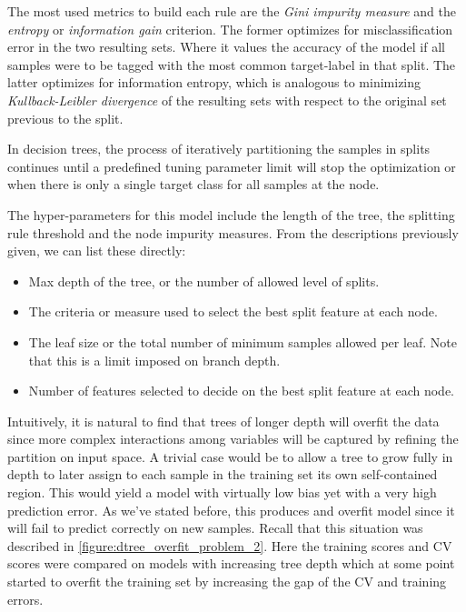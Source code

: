 The most used metrics to build each rule are the \textit{Gini impurity measure} and the \textit{entropy} or \textit{information gain} criterion. The former optimizes for misclassification error in the two resulting sets. Where it values the accuracy of the model if all samples were to be tagged with the most common target-label in that split. The latter optimizes for information entropy, which is analogous to minimizing \textit{Kullback-Leibler divergence} of the resulting sets with respect to the original set previous to the split.

In decision trees, the process of iteratively partitioning the samples in splits continues until a predefined tuning parameter limit will stop the optimization or when there is only a single target class for all samples at the node.

The hyper-parameters for this model include the length of the tree, the splitting rule threshold and the node impurity measures. From the descriptions previously given, we can list these directly:

\begin{itemize}
\item Max depth of the tree, or the number of allowed level of splits.
\item The criteria or measure used to select the best split feature at each node.
\item The leaf size or the total number of minimum samples allowed per leaf. Note that this is a limit imposed on branch depth.
\item Number of features selected to decide on the best split feature at each node.
\end{itemize}



Intuitively, it is natural to find that trees of longer depth will overfit the data since more complex interactions among variables will be captured by refining the partition on input space. A trivial case would be to allow a tree to grow fully in depth to later assign to each sample in the training set its own self-contained region. This would yield a model with virtually low bias yet with a very high prediction error.
As we've stated before, this produces and overfit model since it will fail to predict correctly on new samples.
Recall that this situation was described in \cref{figure:dtree_overfit_problem_2}.
Here the training scores and CV scores were compared on models with increasing tree depth which at some point started to overfit the training set by increasing the gap of the CV and training errors.


